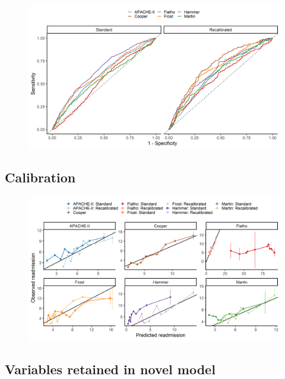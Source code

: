 \documentclass[onecolumn]{article}
\begin{document}

\begin{figure}
\centering
	\includegraphics[width=\textwidth]{discrimination.png}
	\caption{}
	\label{DiscriminationFig}
\end{figure}


\subsection{Calibration}


\begin{figure}
\centering
	\includegraphics[width=\textwidth]{calibration.png}
	\caption{}
	\label{CalibrationFig}
\end{figure}

\subsection{Variables retained in novel model}
\end{document}
